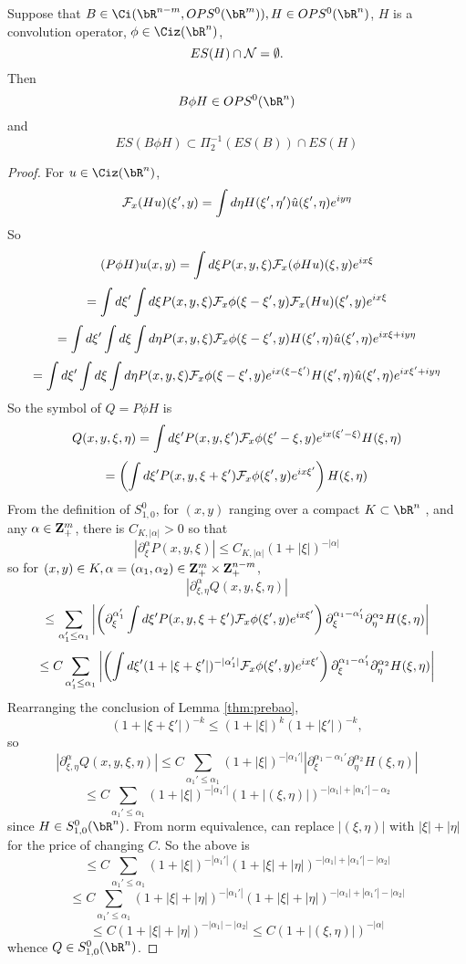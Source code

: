 \begin{proposition}
  \label{thm:bao1}
  Suppose that $B \in \Ci(\bR^{n-m},OPS^0(\bR^m)), H \in OPS^0(\bR^n)$, $H$ is a convolution operator, $\phi \in \Ciz(\bR^n)$,
  \[
    ES(H) \cap {\cal N} = \emptyset.
  \]
  Then
  \[
    B\phi H \in OPS^0(\bR^n)
  \]
  and
  \[
    ES(B\phi H) \subset \Pi_2^{-1}(ES(B)) \cap ES(H)
  \]
\end{proposition}

\begin{proof}
  For $u \in \Ciz(\bR^n)$,
  \[
    {\cal F}_x(Hu)(\xi',y) = \int  d\eta H(\xi',\eta')\hat{u}(\xi',\eta)e^{ i y \eta}
  \]
  So
  \[
    (P\phi H)u(x,y) = \int d \xi P(x,y,\xi) {\cal F}_x(\phi Hu)(\xi,y)e^{i x\xi}
  \]
  \[
    =\int d \xi' \int d \xi P(x,y,\xi) {\cal F}_x\phi(\xi-\xi',y) {\cal F}_x(Hu)(\xi',y)e^{i x\xi}
  \]
  \[
   =\int d \xi' \int d \xi \int d\eta P(x,y,\xi) {\cal F}_x\phi(\xi-\xi',y) H(\xi',\eta)\hat{u}(\xi',\eta)e^{i x\xi + i y\eta }
  \]
  \[
    =\int d \xi' \int d \xi \int d\eta P(x,y,\xi) {\cal F}_x\phi(\xi-\xi',y) e^{ix(\xi-\xi')}H(\xi',\eta)\hat{u}(\xi',\eta)e^{i x\xi' + i y\eta }
  \]
  So the symbol of $Q = P \phi H$ is
  \[
    Q(x,y,\xi,\eta) = \int d\xi' P(x,y,\xi') {\cal F}_x\phi(\xi'-\xi,y) e^{i x(\xi'-\xi)}H(\xi,\eta)
  \]
  \[
    = \left(\int d\xi' P(x,y,\xi+\xi') {\cal F}_x\phi(\xi',y) e^{i x\xi'}\right) H(\xi,\eta)
  \]
  From the definition of $S^0_{1,0}$, for $(x,y)$ ranging over a compact $K \subset \bR^n$ , and any $\alpha \in {\bf Z}_+^m$, there is $C_{K,|\alpha|} > 0$ so that
  \[
    |\partial^{\alpha}_{\xi} P(x,y,\xi)| \le C_{K,|\alpha|}(1 + |\xi|)^{-|\alpha|}
  \]
  so for $(x,y) \in K, \alpha=(\alpha_1,\alpha_2) \in {\bf Z}_+^m \times {\bf Z}_+^{n-m}$,
  \[
    |\partial_{\xi,\eta}^{\alpha} Q(x,y,\xi,\eta)|
  \]
  \[
    \le \sum_{\alpha_1' \le \alpha_1} \left|\left(\partial_{\xi}^{\alpha_1'}  \int d\xi' P(x,y,\xi+\xi') {\cal F}_x\phi(\xi',y) e^{i x\xi'}\right)\partial_{\xi}^{\alpha_1-\alpha_1'} \partial_{\eta}^{\alpha_2}H(\xi,\eta)       \right|
  \]
  \[
    \le C \sum_{\alpha_1' \le \alpha_1} \left|\left(  \int d\xi' (1 + |\xi+\xi'|)^{-|\alpha_1'|} {\cal F}_x\phi(\xi',y) e^{i x\xi'}\right)\partial_{\xi}^{\alpha_1-\alpha_1'} \partial_{\eta}^{\alpha_2}H(\xi,\eta)       \right|
  \]
  Rearranging the conclusion of Lemma \ref{thm:prebao},
  \[
    (1 + |\xi + \xi'|)^{-k} \le (1+|\xi|)^k(1+|\xi'|)^{-k},
  \]
  so
  \[
    |\partial_{\xi,\eta}^{\alpha} Q(x,y,\xi,\eta)| \le C \sum_{\alpha_1' \le \alpha_1} (1 + |\xi|)^{-|\alpha_1'|}|\partial_{\xi}^{\alpha_1-\alpha_1'}\partial_{\eta}^{\alpha_2}H(\xi,\eta) |
  \]
  \[
    \le C \sum_{\alpha_1' \le \alpha_1} (1 + |\xi|)^{-|\alpha_1'|}(1 + |(\xi,\eta)|)^{-|\alpha_1|+|\alpha_1'|-\alpha_2}
  \]
  since $H \in S^0_{1,0}(\bR^n)$. From norm equivalence, can replace $|(\xi,\eta)|$ with $|\xi| + |\eta|$   for the price of changing $C$.  So the above is
  \[
    \le C \sum_{\alpha_1' \le \alpha_1} (1 + |\xi|)^{-|\alpha_1'|}(1 + |\xi| + |\eta|)^{-|\alpha_1|+|\alpha_1'|-|\alpha_2|}
  \]
  \[
    \le C \sum_{\alpha_1' \le \alpha_1} (1 + |\xi|+ |\eta|)^{-|\alpha_1'|}(1 + |\xi| + |\eta|)^{-|\alpha_1|+|\alpha_1'|-|\alpha_2|}
  \]
  \[
    \le C (1 + |\xi| + |\eta|)^{-|\alpha_1|-|\alpha_2|} \le C(1 + |(\xi,\eta)|)^{-|\alpha|}
  \]
  whence $Q \in S^{0}_{1,0}(\bR^n)$.
    
\end{proof}



